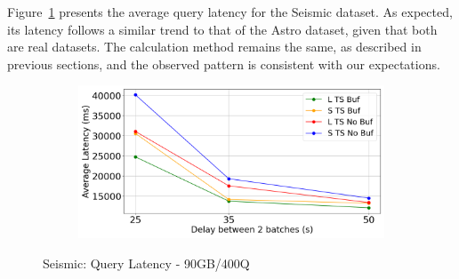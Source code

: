 %
Figure~\ref{fig:query-latency-seismic} presents the average query latency for the Seismic
dataset. As expected, its latency follows a similar trend to that of the Astro dataset,
given that both are real datasets. The calculation method remains the same, as described in
previous sections, and the observed pattern is consistent with our expectations.

\begin{figure}
	\centering
	\begin{subfigure}[c]{0.48\textwidth}
		\includegraphics[width=1\textwidth]   {figures/Experiments/Dynamic/SEISMIC/average_latency_SEISMIC.png}
	\end{subfigure}
	\caption{Seismic: Query Latency - 90GB/400Q}
	\label{fig:query-latency-seismic}
\end{figure}